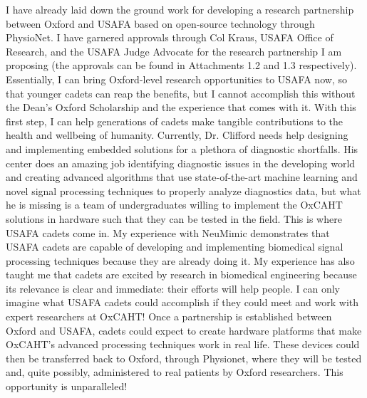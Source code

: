 \documentclass{article}
\begin{document}
I have already laid down the ground work for developing a research partnership 
between Oxford and USAFA based on open-source technology through PhysioNet. 
I have garnered approvals through Col Kraus, USAFA Office of Research, and the
USAFA Judge Advocate for the research partnership I am proposing (the
approvals can be found in Attachments 1.2 and 1.3
respectively). Essentially, I can bring Oxford-level research opportunities to USAFA
now, so that younger cadets can reap the benefits, but I cannot accomplish this without
the Dean's Oxford Scholarship and the experience that comes with it. With this first step,
I can help generations of cadets make tangible contributions to the health and wellbeing of humanity.
Currently, Dr. Clifford needs help designing and implementing embedded solutions
for a plethora of diagnostic shortfalls. His center does an amazing job
identifying diagnostic issues in the developing world and creating advanced algorithms that use
state-of-the-art machine learning and novel signal processing techniques to
properly analyze diagnostics data, but what he is missing is a team of
undergraduates willing to implement the OxCAHT solutions in hardware such that
they can be tested in the field. This is where USAFA cadets come in. My experience with 
NeuMimic demonstrates that USAFA cadets are capable of developing and implementing biomedical 
signal processing techniques because they are already doing it. My experience has also taught me that
cadets are excited by research in biomedical engineering because its relevance is clear and immediate:
their efforts will help people. I can only
imagine what USAFA cadets could accomplish if they could meet and work with
expert researchers at OxCAHT! Once a partnership is established between Oxford and USAFA,
cadets could expect to create hardware platforms that make OxCAHT's advanced processing techniques
work in real life. These devices could then be transferred back to Oxford, through Physionet,
where they will be tested and, quite possibly, administered to real patients by Oxford researchers.
This opportunity is unparalleled!
\end{document}
